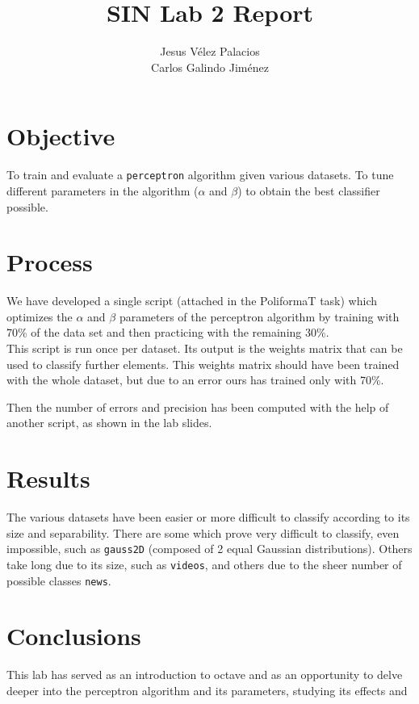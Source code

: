 \documentclass{article}
\title{SIN Lab 2 Report}
\author{Jesus Vélez Palacios\\Carlos Galindo Jiménez}
\date{}
\begin{document}
    \maketitle
    
    \section{Objective}
    To train and evaluate a \texttt{perceptron} algorithm given various datasets. To tune different parameters in the algorithm ($\alpha$ and $\beta$) to obtain the best classifier possible.
    
    \section{Process}
    We have developed a single script (attached in the PoliformaT task) which optimizes the $\alpha$ and $\beta$ parameters of the perceptron algorithm by training with 70\% of the data set and then practicing with the remaining 30\%. \\
    This script is run once per dataset. Its output is the weights matrix that can be used to classify further elements. This weights matrix should have been trained with the whole dataset, but due to an error ours has trained only with 70\%.
    
    Then the number of errors and precision has been computed with the help of another script, as shown in the lab slides.
    
    \section{Results}
    The various datasets have been easier or more difficult to classify according to its size and separability. There are some which prove very difficult to classify, even impossible, such as \texttt{gauss2D} (composed of 2 equal Gaussian distributions). Others take long due to its size, such as \texttt{videos}, and others due to the sheer number of possible classes \texttt{news}.
    
    \section{Conclusions}
    This lab has served as an introduction to octave and as an opportunity to delve deeper into the perceptron algorithm and its parameters, studying its effects and 
\end{document}
